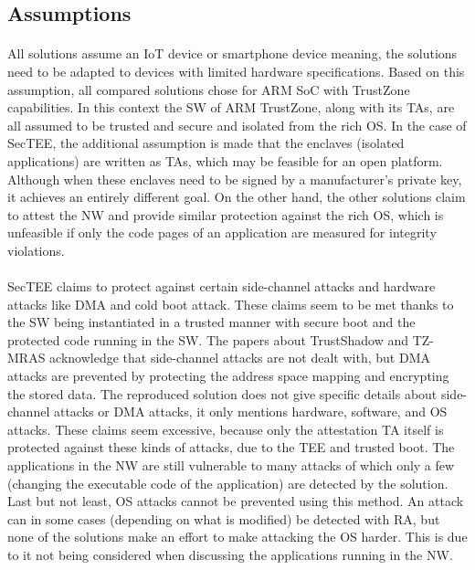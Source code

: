 \subsection*{Assumptions}

\paragraph*{}
All solutions assume an IoT device or smartphone device meaning, the solutions need to be adapted to devices with limited hardware specifications. Based on this assumption, all compared solutions chose for ARM SoC with TrustZone capabilities. In this context the SW of ARM TrustZone, along with its TAs, are all assumed to be trusted and secure and isolated from the rich OS. In the case of SecTEE, the additional assumption is made that the enclaves (isolated applications) are written as TAs, which may be feasible for an open platform. Although when these enclaves need to be signed by a manufacturer's private key, it achieves an entirely different goal. On the other hand, the other solutions claim to attest the NW and provide similar protection against the rich OS, which is unfeasible if only the code pages of an application are measured for integrity violations. 

\paragraph*{}
SecTEE claims to protect against certain side-channel attacks and hardware attacks like DMA and cold boot attack. These claims seem to be met thanks to the SW being instantiated in a trusted manner with secure boot and the protected code running in the SW. The papers about TrustShadow and TZ-MRAS acknowledge that side-channel attacks are not dealt with, but DMA attacks are prevented by protecting the address space mapping and encrypting the stored data. The reproduced solution does not give specific details about side-channel attacks or DMA attacks, it only mentions hardware, software, and OS attacks. These claims seem excessive, because only the attestation TA itself is protected against these kinds of attacks, due to the TEE and trusted boot. The applications in the NW are still vulnerable to many attacks of which only a few (changing the executable code of the application) are detected by the solution. Last but not least, OS attacks cannot be prevented using this method. An attack can in some cases (depending on what is modified) be detected with RA, but none of the solutions make an effort to make attacking the OS harder. This is due to it not being considered when discussing the applications running in the NW.

